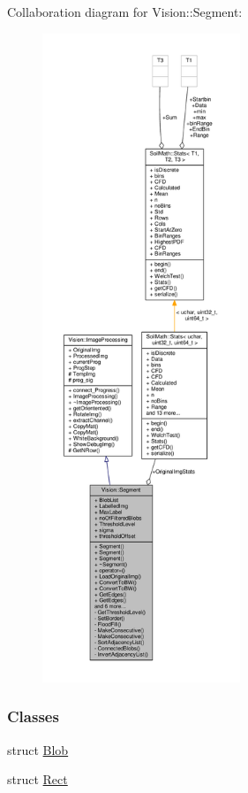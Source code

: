 Collaboration diagram for Vision\+:\+:Segment\+:
\nopagebreak
\begin{figure}[H]
\begin{center}
\leavevmode
\includegraphics[height=550pt]{class_vision_1_1_segment__coll__graph}
\end{center}
\end{figure}
\subsubsection*{Classes}
\begin{DoxyCompactItemize}
\item 
struct \hyperlink{struct_vision_1_1_segment_1_1_blob}{Blob}
\item 
struct \hyperlink{struct_vision_1_1_segment_1_1_rect}{Rect}
\end{DoxyCompactItemize}
